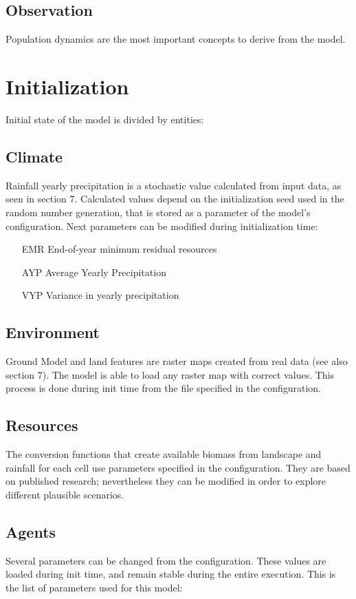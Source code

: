 \documentclass[11pt,oneside,a4paper,openright]{report}
\begin{document}
\subsection{Observation}
Population dynamics are the most important concepts to derive from the model.

\section{Initialization}
Initial state of the model is divided by entities:

\subsection{Climate}
Rainfall yearly precipitation is a stochastic value calculated from input data, as seen in section 7.
Calculated values depend on the initialization seed used in the random number generation, that is
stored as a parameter of the model's configuration. Next parameters can be modified during
initialization time:
	\begin{enumerate}
	\item[EMR] End-of-year minimum residual resources
	\item[AYP] Average Yearly Precipitation
	\item[VYP] Variance in yearly precipitation
	\end{enumerate}


\subsection{Environment}
Ground Model and land features are raster maps created from real data (see also section 7). The
model is able to load any raster map with correct values. This process is done during init time from the
file specified in the configuration.


\subsection{Resources}
The conversion functions that create available biomass from landscape and rainfall for each cell use
parameters specified in the configuration. They are based on published research; nevertheless they
can be modified in order to explore different plausible scenarios.

\subsection{Agents}
Several parameters can be changed from the configuration. These values are loaded during init time,
and remain stable during the entire execution. This is the list of parameters used for this model:
\end{document}
